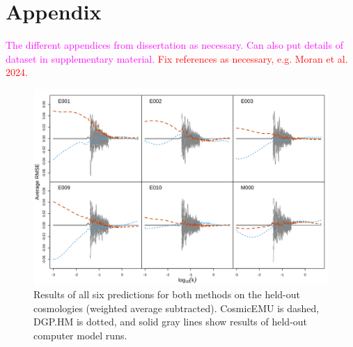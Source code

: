 \documentclass[11pt]{article}
\begin{document}
\section{Appendix}
\label{sec:apdx}

\textcolor{magenta}{The different appendices from dissertation as necessary. Can also put details of dataset in supplementary material.} \textcolor{red}{Fix references as necessary, e.g. Moran et al. 2024.}

\begin{figure}[ht]
    \centering
    \includegraphics[width=6in]{pred_1to6.png}
    \caption{Results of all six predictions for both methods on the held-out cosmologies (weighted average subtracted). CosmicEMU is dashed, DGP.HM is dotted, and solid gray lines show results of held-out computer model runs.}
    \label{fig:plot_pred_1to6}
\end{figure}



\end{document}
